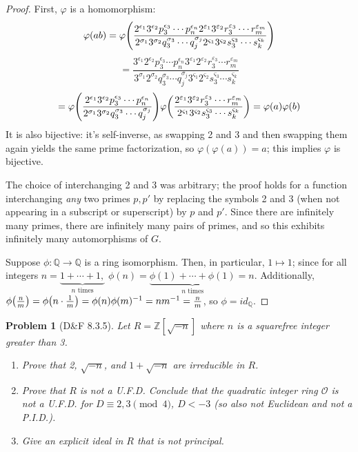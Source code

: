 \documentclass{article}
\newtheorem{plm}{Problem}
\begin{document}
\begin{proof}
  First, $\varphi$ is a homomorphism:
  \[
    \varphi(ab) = \varphi\qty(\frac{2^{\epsilon_{1}}3^{\epsilon_{2}}p_{3}^{\epsilon_{3}} \cdots p_{n}^{\epsilon_{n}}
      2^{\varepsilon_{1}}3^{\varepsilon_{2}}r_{3}^{\varepsilon_{3}} \cdots r_{m}^{\varepsilon_{m}}}
    {2^{\sigma_{1}}3^{\sigma_{2}}q_{3}^{\sigma_{3}} \cdots q_{j}^{\sigma_{j}} 2^{\varsigma_{1}}3^{\varsigma_{2}}s_{3}^{\varsigma_{3}} \cdots s_{k}^{\varsigma_{k}}})
  \]
  \[
    = \frac{3^{\epsilon_{1}}2^{\epsilon_{2}}p_{3}^{\epsilon_{3}} \cdots p_{n}^{\epsilon_{n}}
      3^{\varepsilon_{1}}2^{\varepsilon_{2}}r_{3}^{\varepsilon_{3}} \cdots r_{m}^{\varepsilon_{m}}}
    {3^{\sigma_{1}}2^{\sigma_{2}}q_{3}^{\sigma_{3}} \cdots q_{j}^{\sigma_{j}} 3^{\varsigma_{1}}2^{\varsigma_{2}}s_{3}^{\varsigma_{3}} \cdots s_{k}^{\varsigma_{k}}}
  \]
  \[
    = \varphi\qty(\frac{2^{\epsilon_{1}}3^{\epsilon_{2}}p_{3}^{\epsilon_{3}} \cdots p_{n}^{\epsilon_{n}}}
    {2^{\sigma_{1}}3^{\sigma_{2}}q_{3}^{\sigma_{3}} \cdots q_{j}^{\sigma_{j}}})
    \varphi\qty(\frac{2^{\varepsilon_{1}}3^{\varepsilon_{2}}r_{3}^{\varepsilon_{3}} \cdots r_{m}^{\varepsilon_{m}}}
    {2^{\varsigma_{1}}3^{\varsigma_{2}}s_{3}^{\varsigma_{3}} \cdots s_{k}^{\varsigma_{k}}})
    = \varphi(a)\varphi(b)
  \]
  It is also bijective: it's self-inverse, as swapping 2 and 3 and then swapping them again yields the same prime factorization, so
  $\varphi(\varphi(a)) = a$; this implies $\varphi$ is bijective.

  The choice of interchanging 2 and 3 was arbitrary; the proof holds for a function interchanging \textit{any} two primes $p, p'$
  by replacing the symbols 2 and 3 (when not appearing in a subscript or superscript) by $p$ and $p'$.
  Since there are infinitely many primes, there are infinitely many pairs of primes, and so this exhibits infinitely many automorphisms of $G$.

  Suppose $\phi: \mathbb{Q} \to \mathbb{Q}$ is a ring isomorphism.
  Then, in particular, $1 \mapsto 1$; since for all integers $n = \underbrace{1 + \cdots + 1,}_{n \text{ times}}$
  $\phi(n) = \underbrace{\phi(1) + \cdots + \phi(1)}_{n \text{ times}} = n$.
  Additionally, $\phi\qty(\frac{n}{m}) = \phi\qty(n \cdot \frac{1}{m}) = \phi(n)\phi(m)^{-1} = nm^{-1} = \frac{n}{m}$,
  so $\phi = id_{\mathbb{Q}}$.
\end{proof}

\begin{plm}[D\&F 8.3.5]
  Let $R = \mathbb{Z}[\sqrt{-n}]$ where $n$ is a squarefree integer greater than 3.
  \begin{enumerate}
  \item Prove that 2, $\sqrt{-n}$, and $1 + \sqrt{-n}$ are irreducible in $R$.
  \item Prove that $R$ is not a U.F.D.
    Conclude that the quadratic integer ring $\mathcal{O}$ is not a U.F.D. for $D \equiv 2, 3 \pmod 4$, $D < -3$
    (so also not Euclidean and not a P.I.D.).
  \item Give an explicit ideal in $R$ that is not principal.
  \end{enumerate}
\end{plm}
\end{document}
